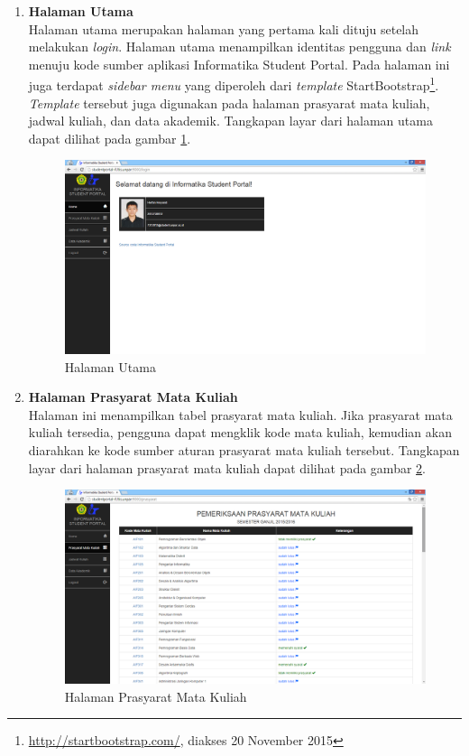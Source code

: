 \begin{enumerate}
				\item\textbf{Halaman Utama}\\
				Halaman utama merupakan halaman yang pertama kali dituju setelah melakukan \textit{login}. Halaman utama menampilkan identitas pengguna dan \textit{link} menuju kode sumber aplikasi Informatika Student Portal. Pada halaman ini juga terdapat \textit{sidebar menu} yang diperoleh dari \textit{template} StartBootstrap\footnote{\url{http://startbootstrap.com/}, diakses 20 November 2015}. \textit{Template} tersebut juga digunakan pada halaman prasyarat mata kuliah, jadwal kuliah, dan data akademik. Tangkapan layar dari halaman utama dapat dilihat pada gambar \ref{fig:5_hasil_utama}.
					\begin{figure}[H]
						\centering
						\includegraphics[scale=0.34]{Gambar/hasil_home}
						\caption{Halaman Utama} 
						\label{fig:5_hasil_utama}
					\end{figure}
						
				\item\textbf{Halaman Prasyarat Mata Kuliah}\\
				Halaman ini menampilkan tabel prasyarat mata kuliah. Jika prasyarat mata kuliah tersedia, pengguna dapat mengklik kode mata kuliah, kemudian akan diarahkan ke kode sumber aturan prasyarat mata kuliah tersebut. Tangkapan layar dari halaman prasyarat mata kuliah dapat dilihat pada gambar \ref{fig:5_hasil_prasyarat}.
					\begin{figure}[H]
						\centering
						\includegraphics[scale=0.34]{Gambar/hasil_prasyarat}
						\caption{Halaman Prasyarat Mata Kuliah} 
						\label{fig:5_hasil_prasyarat}
					\end{figure}


\end{enumerate}
